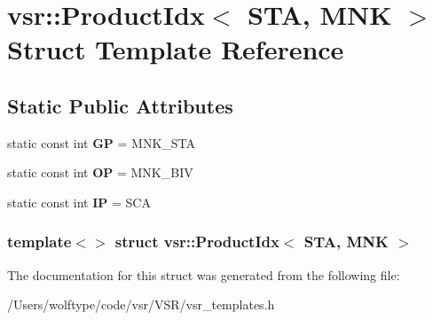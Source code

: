 \hypertarget{structvsr_1_1_product_idx_3_01_s_t_a_00_01_m_n_k_01_4}{\section{vsr\-:\-:Product\-Idx$<$ S\-T\-A, M\-N\-K $>$ Struct Template Reference}
\label{structvsr_1_1_product_idx_3_01_s_t_a_00_01_m_n_k_01_4}
}
\subsection*{Static Public Attributes}
\begin{DoxyCompactItemize}
\item 
\hypertarget{structvsr_1_1_product_idx_3_01_s_t_a_00_01_m_n_k_01_4_a9c1965697359a9dec8bb53169d8aca12}{static const int {\bfseries G\-P} = M\-N\-K\-\_\-\-S\-T\-A}\label{structvsr_1_1_product_idx_3_01_s_t_a_00_01_m_n_k_01_4_a9c1965697359a9dec8bb53169d8aca12}

\item 
\hypertarget{structvsr_1_1_product_idx_3_01_s_t_a_00_01_m_n_k_01_4_a76b397bd3e2f44d78cda92917eab0e61}{static const int {\bfseries O\-P} = M\-N\-K\-\_\-\-B\-I\-V}\label{structvsr_1_1_product_idx_3_01_s_t_a_00_01_m_n_k_01_4_a76b397bd3e2f44d78cda92917eab0e61}

\item 
\hypertarget{structvsr_1_1_product_idx_3_01_s_t_a_00_01_m_n_k_01_4_a73f11ac46d7cfdcc1d5514adb42bbdd1}{static const int {\bfseries I\-P} = S\-C\-A}\label{structvsr_1_1_product_idx_3_01_s_t_a_00_01_m_n_k_01_4_a73f11ac46d7cfdcc1d5514adb42bbdd1}

\end{DoxyCompactItemize}
\subsubsection*{template$<$$>$ struct vsr\-::\-Product\-Idx$<$ S\-T\-A, M\-N\-K $>$}



The documentation for this struct was generated from the following file\-:\begin{DoxyCompactItemize}
\item 
/\-Users/wolftype/code/vsr/\-V\-S\-R/vsr\-\_\-templates.\-h\end{DoxyCompactItemize}

